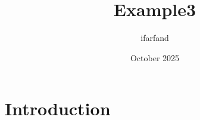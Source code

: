 \documentclass{article}
\title{Example3}
\author{ifarfand }
\date{October 2025}
\begin{document}
\maketitle

\section{Introduction}
\end{document}
